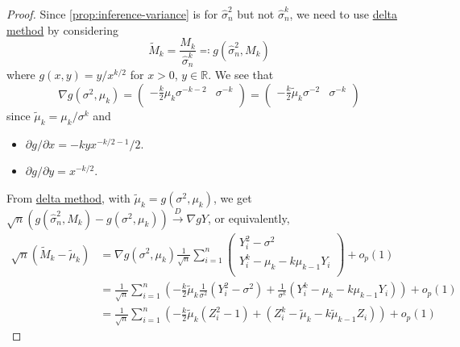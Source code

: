 \begin{proof}
	Since \autoref{prop:inference-variance} is for \(\hat{\sigma} _n^2\) but not \(\hat{\sigma} _n^k\), we need to use \hyperref[thm:delta-method]{delta method} by considering
	\[
		\widetilde{M} _k
		= \frac{M_k}{\hat{\sigma} _n^k}
		\eqqcolon g(\hat{\sigma} _n^2, M_k)
	\]
	where \(g(x, y) = y / x^{k / 2}\) for \(x > 0\), \(y \in \mathbb{R} \). We see that
	\[
		\nabla g(\sigma ^2, \mu _k)
		= \begin{pmatrix}
			-\frac{k}{2} \mu _k \sigma ^{-k - 2} & \sigma ^{-k} \\
		\end{pmatrix}
		= \begin{pmatrix}
			-\frac{k}{2} \widetilde{\mu} _k \sigma ^{-2} & \sigma ^{-k} \\
		\end{pmatrix}
	\]
	since \(\widetilde{\mu} _k = \mu _k / \sigma ^k\) and
	\begin{itemize}
		\item \(\partial g / \partial x = - k y x^{-k / 2 - 1} / 2\).
		\item \(\partial g / \partial y = x^{-k / 2}\).
	\end{itemize}
	From \hyperref[thm:delta-method]{delta method}, with \(\widetilde{\mu} _k = g(\sigma ^2, \mu _k)\), we get \(\sqrt{n} (g(\hat{\sigma} _n^2, M_k) - g(\sigma ^2, \mu _k)) \overset{D}{\to } \nabla g Y\), or equivalently,
	\[
		\begin{split}
			\sqrt{n} (\widetilde{M} _k - \widetilde{\mu} _k)
			 & = \nabla g(\sigma ^2, \mu _k) \frac{1}{\sqrt{n} } \sum_{i=1}^{n} \begin{pmatrix}
				                                                                    Y_i^2 - \sigma ^2                 \\
				                                                                    Y_i^k - \mu _k - k \mu _{k-1} Y_i \\
			                                                                    \end{pmatrix} + o_p(1)                                                                                             \\
			 & = \frac{1}{\sqrt{n} } \sum_{i=1}^{n} \left( -\frac{k}{2} \widetilde{\mu} _k \frac{1}{\sigma ^2} (Y_i^2 - \sigma ^2) + \frac{1}{\sigma ^k} (Y_i^k - \mu _k - k \mu _{k-1} Y_i) \right) + o_p(1) \\
			 & = \frac{1}{\sqrt{n} } \sum_{i=1}^{n} \left( -\frac{k}{2} \widetilde{\mu} _k (Z_i^2 - 1) + (Z_i^k - \widetilde{\mu} _k - k \widetilde{\mu} _{k-1} Z_i ) \right) + o_p(1)

\end{split}\]
\end{proof}

